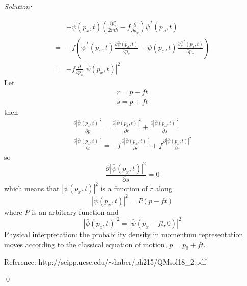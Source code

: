 \documentclass[12pt,a4paper]{article}
\newenvironment{sol}
    {\emph{Solution:}
    }
    {
    \qed
    }
\begin{document}
\begin{sol}
\begin{itemize}
\begin{align}
\nonumber&+\bar{\psi}(p_x,t)\left(\frac{ip_x^2}{2m\hbar}-f\frac{\partial}{\partial p_x}\right)\bar{\psi}^*(p_x,t)\\
\nonumber=&-f\left(\bar{\psi}^*(p_x,t)\frac{\partial\bar{\psi}(p_x,t)}{\partial p_x}+\bar{\psi}(p_x,t)\frac{\partial\bar{\psi}^*(p_x,t)}{\partial p_x}\right)\\
=&-f\frac{\partial}{\partial p_x}|\bar{\psi}(p_x,t)|^2
\end{align}
Let
\begin{gather}
r=p-ft\\
s=p+ft
\end{gather}
then
\begin{gather}
\frac{\partial|\bar{\psi}(p_x,t)|^2}{\partial p}=\frac{\partial|\bar{\psi}(p_x,t)|^2}{\partial r}+\frac{\partial|\bar{\psi}(p_x,t)|^2}{\partial s}\\
\frac{\partial|\bar{\psi}(p_x,t)|^2}{\partial t}=-f\frac{\partial|\bar{\psi}(p_x,t)|^2}{\partial r}+f\frac{\partial|\bar{\psi}(p_x,t)|^2}{\partial s}
\end{gather}
so
\begin{equation}
\frac{\partial|\bar{\psi}(p_x,t)|^2}{\partial s}=0
\end{equation}
which means that $|\bar{\psi}(p_x,t)|^2$ is a function of $r$ along
\begin{equation}
|\bar{\psi}(p_x,t)|^2=P(p-ft)
\end{equation}
where $P$ is an arbitrary function and
\begin{equation}
|\bar{\psi}(p_x,t)|^2=|\bar{\psi}(p_x-ft,0)|^2
\end{equation}
Physical interpretation: the probability density in momentum representation moves according to the classical equation of motion, $p=p_0+ft$.
\end{itemize}
Reference: http://scipp.ucsc.edu/$\sim$haber/ph215/QMsol18\_2.pdf
\end{sol}
\end{document}
